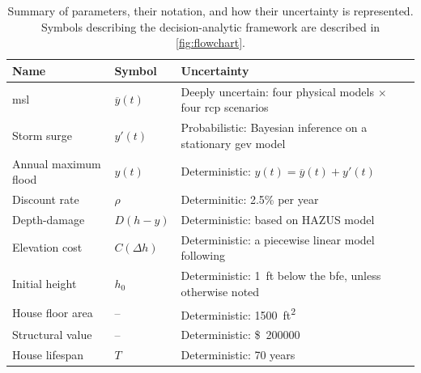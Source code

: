 \documentclass[11pt]{article}
\newcommand{\usd}[1]{\SI{#1}[\$]{}}
\begin{document}
\begin{table}
    \centering
    \caption{
        Summary of parameters, their notation, and how their uncertainty is represented.
        Symbols describing the decision-analytic framework are described in \cref{fig:flowchart}.
    }\label{tab:uncertainties}
    \footnotesize
    \begin{tabular}{p{1.25in} p{0.75in} p{3in}}
        \toprule
        Name                 & Symbol            & Uncertainty                                                                          \\
        \midrule
        \Gls{msl}            & $\overline{y}(t)$ & Deeply uncertain: four physical models $\times$ four \acrshort{rcp} scenarios        \\
        Storm surge          & $y'(t)$           & Probabilistic: Bayesian inference on a stationary \acrshort{gev} model               \\
        Annual maximum flood & $y(t)$            & Deterministic: $y(t)=\overline{y}(t)+y'(t)$                                          \\
        Discount rate        & $\rho$            & Determinitic: 2.5\% per year                                                         \\
        Depth-damage         & $D(h-y)$          & Deterministic: based on HAZUS model \citep[see][]{zarekarizi_suboptimal:2020}        \\
        Elevation cost       & $C(\Delta h)$     & Deterministic: a piecewise linear model following \citet{zarekarizi_suboptimal:2020} \\
        Initial height       & $h_0$             & Deterministic: \SI{1}{ft} below the \gls{bfe}, unless otherwise noted                \\
        House floor area     & --                & Deterministic: \SI{1500}{ft^2}                                                       \\
        Structural value     & --                & Deterministic: \usd{200000}                                                          \\
        House lifespan       & $T$               & Deterministic: 70 years                                                              \\
        \bottomrule
    \end{tabular}
\end{table}
\end{document}

